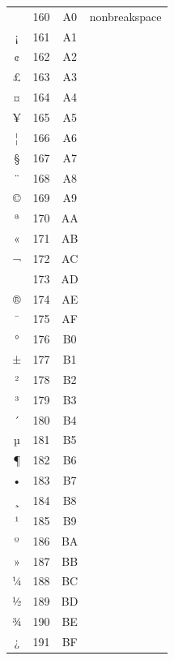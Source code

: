 ﻿\documentclass[10pt]{article}
\begin{document}
\begin{tabular}{crcl}
 &160&A0&nonbreakspace\\
¡&161&A1&\\
¢&162&A2&\\
£&163&A3&\\
¤&164&A4&\\
¥&165&A5&\\
¦&166&A6&\\
§&167&A7&\\
¨&168&A8&\\
©&169&A9&\\
ª&170&AA&\\
«&171&AB&\\
¬&172&AC&\\
­&173&AD&\\
®&174&AE&\\
¯&175&AF&\\
°&176&B0&\\
±&177&B1&\\
²&178&B2&\\
³&179&B3&\\
´&180&B4&\\
µ&181&B5&\\
¶&182&B6&\\
•&183&B7&\\
¸&184&B8&\\
¹&185&B9&\\
º&186&BA&\\
»&187&BB&\\
¼&188&BC&\\
½&189&BD&\\
¾&190&BE&\\
¿&191&BF&\\
\end{tabular}
\end{document}
